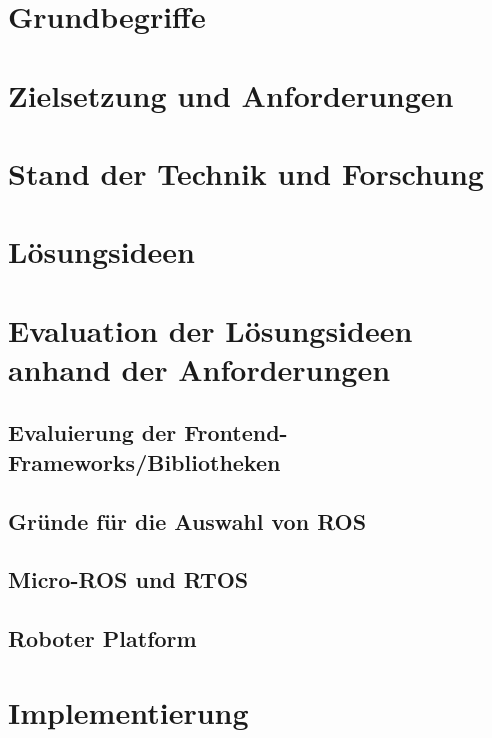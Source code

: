 \documentclass[11pt,oneside,a4paper,titlepage]{article}
\begin{document}
\section{Grundbegriffe}

\pagebreak

\section{Zielsetzung und Anforderungen}


\section{Stand der Technik und Forschung}


\section{Lösungsideen}


\section{Evaluation der Lösungsideen anhand der Anforderungen}

\subsection{Evaluierung der Frontend-Frameworks/Bibliotheken}


\subsection{Gründe für die Auswahl von ROS}


\subsection{Micro-ROS und RTOS}


\subsection{Roboter Platform}


\section{Implementierung}
\end{document}

